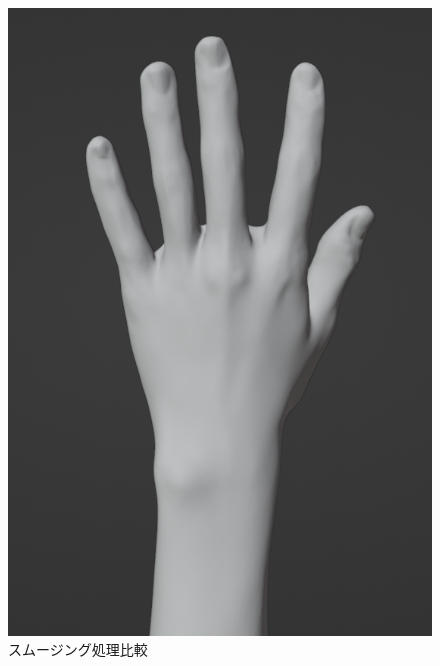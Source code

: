 \documentclass{ltjsreport}
\begin{document}
\begin{figure}[H]
\begin{minipage}{0.4\columnwidth}
			\includegraphics[width = \columnwidth]{../figs/SmoothingAfterRear.png}
			\end{minipage}
			\caption{スムージング処理比較}
			\end{figure}
\end{document}
